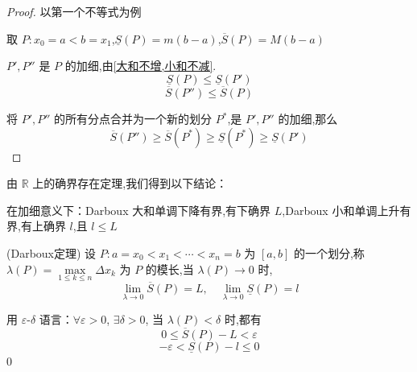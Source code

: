 \begin{proof}
	以第一个不等式为例
	
	取 $P: x_0 = a < b = x_1$,$\underline{S}(P) = m(b-a)$,$\overline{S}(P) = M(b-a)$
	
	$P', P''$ 是 $P$ 的加细,由\ref{大和不增,小和不减}.
	\[
	\underline{S}(P) \leq \underline{S}(P')
	\]
	\[
	\overline{S}(P'') \leq \overline{S}(P)
	\]
	
	将 $P', P''$ 的所有分点合并为一个新的划分 $P^*$,是 $P', P''$ 的加细,那么
	\[
	\overline{S}(P'') \geq \overline{S}(P^*) \geq \underline{S}(P^*) \geq \underline{S}(P')
	\]
	
	
\end{proof}
由 $\mathbb{R}$ 上的确界存在定理,我们得到以下结论：

在加细意义下：Darboux 大和单调下降有界,有下确界 $L$,Darboux 小和单调上升有界,有上确界 $l$,且 $l \leq L$
\begin{proposition}(Darboux定理)\label{Darboux定理}
	设 $P: a = x_0 < x_1 < \cdots < x_n = b$ 为 $[a,b]$ 的一个划分,称
	$\lambda(P) = \max\limits_{1 \leq k \leq n} \Delta x_k$ 为 $P$ 的模长,当 $\lambda(P) \to 0$ 时,
	\[
	\lim_{\lambda \to 0} \overline{S}(P) = L, \quad \lim_{\lambda \to 0} \underline{S}(P) = l
	\]
	
	用 $\varepsilon$-$\delta$ 语言：$\forall \varepsilon > 0$, $\exists \delta > 0$, 当 $\lambda(P) < \delta$ 时,都有
	\[
	0 \leq \overline{S}(P) - L < \varepsilon
	\]
	\[
	-\varepsilon < \underline{S}(P) - l \leq 0
	\]
0\end{proposition}

